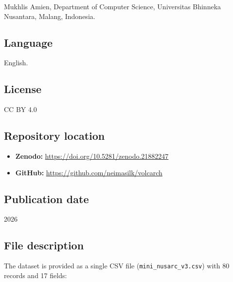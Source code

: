 \documentclass[11pt]{article}
\begin{document}
Mukhlis Amien, Department of Computer Science, Universitas Bhinneka Nusantara, Malang, Indonesia.

\subsection{Language}

English.

\subsection{License}

CC BY 4.0

\subsection{Repository location}

\begin{itemize}
    \item \textbf{Zenodo:} \url{https://doi.org/10.5281/zenodo.21882247}
    \item \textbf{GitHub:} \url{https://github.com/neimasilk/volcarch}
\end{itemize}

\subsection{Publication date}

2026

\subsection{File description}

The dataset is provided as a single CSV file (\texttt{mini\_nusarc\_v3.csv}) with 80 records and 17 fields:
\end{document}

